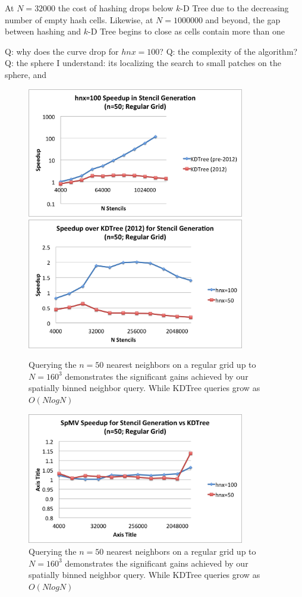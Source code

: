 \documentclass{report}
\begin{document}
At $N=32000$ the cost of hashing drops below $k$-D Tree due to the decreasing number of empty hash cells. Likewise, at $N=1000000$ and beyond, the gap between hashing and $k$-D Tree begins to close as cells contain more than one 


Q: why does the curve drop for $hnx=100$? 
Q: the complexity of the algorithm? 
Q: the sphere I understand: its localizing the search to small patches on the sphere, and 





\begin{figure}
\centering
\includegraphics[width=9.5cm]{../figures/stencils/kdtree_old_reg_subsets_4m_stencil_gen_speedup.png}
\includegraphics[width=9.5cm]{../figures/stencils/reg_subsets_4m_stencil_gen_speedup.png}
\caption{Querying the $n=50$ nearest neighbors on a regular grid up to $N=160^3$ demonstrates the significant gains achieved by our spatially binned neighbor query. While KDTree queries grow as $O(N log N)$}
\label{fig:hash_results}
\end{figure}
\begin{figure}
\centering
\includegraphics[width=9.5cm]{../figures/stencils/reg_subsets_4m_spmv_speedup.png}
\caption{Querying the $n=50$ nearest neighbors on a regular grid up to $N=160^3$ demonstrates the significant gains achieved by our spatially binned neighbor query. While KDTree queries grow as $O(N log N)$}
\label{fig:hash_results}
\end{figure}
\end{document}
